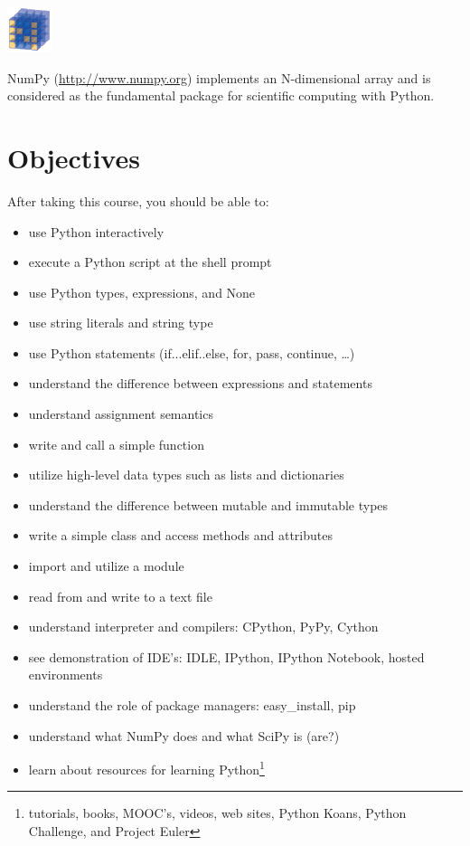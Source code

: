 \documentclass{tufte-handout}
\begin{document}
\begin{marginfigure}%
  \includegraphics[width=0.4\linewidth]{numpy}
  \caption{NumPy (\url{http://www.numpy.org}) implements an N-dimensional
    array and is considered as the fundamental package for
    scientific computing with Python.}
  \label{fig:NumPy}
\end{marginfigure} 

\section{Objectives}\label{sec:objectives}
After taking this course, you should be able to:
\begin{itemize} \itemsep1pt \parskip0pt 
  \item use Python interactively
  \item execute a Python script at the shell prompt
  \item use Python types, expressions, and None
  \item use string literals and string type %
  \item use Python statements (if...elif..else, for, pass, continue,
\ldots)
  \item understand the difference between expressions and statements
  \item understand assignment semantics
  \item write and call a simple function %
  \item utilize high-level data types such as lists and dictionaries
  \item understand the difference between mutable and immutable types
  \item write a simple class and access methods and attributes
  \item import and utilize a module %
  \item read from and write to a text file
  \item understand interpreter and compilers: CPython, PyPy, Cython
  \item see demonstration of IDE's: IDLE, IPython, IPython
     Notebook, hosted environments
  \item understand the role of package managers: easy\_install, pip
  \item understand what NumPy does and what SciPy is (are?) 
  \item learn about resources for learning Python\footnote{tutorials,
        books, MOOC's, videos, web sites, Python Koans,
        Python Challenge, and Project Euler}

\end{itemize}
\end{document}
